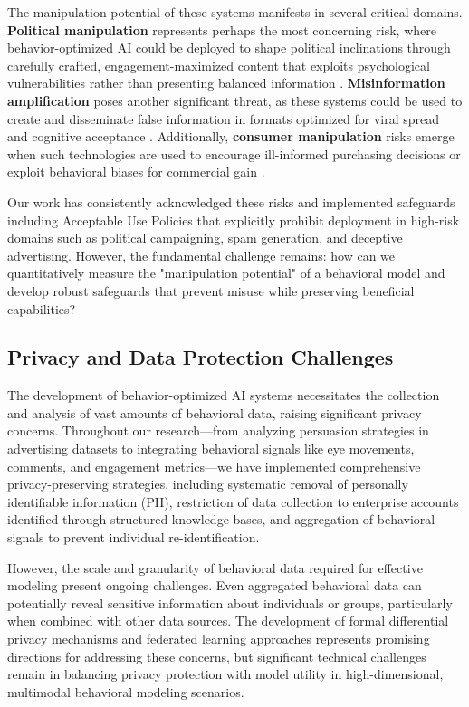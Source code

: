 The manipulation potential of these systems manifests in several critical domains. \textbf{Political manipulation} represents perhaps the most concerning risk, where behavior-optimized AI could be deployed to shape political inclinations through carefully crafted, engagement-maximized content that exploits psychological vulnerabilities rather than presenting balanced information \cite{tappin2023quantifying}. \textbf{Misinformation amplification} poses another significant threat, as these systems could be used to create and disseminate false information in formats optimized for viral spread and cognitive acceptance \cite{lukito2020coordinating}. Additionally, \textbf{consumer manipulation} risks emerge when such technologies are used to encourage ill-informed purchasing decisions or exploit behavioral biases for commercial gain \cite{boerman2017online}.

Our work has consistently acknowledged these risks and implemented safeguards including Acceptable Use Policies that explicitly prohibit deployment in high-risk domains such as political campaigning, spam generation, and deceptive advertising. However, the fundamental challenge remains: how can we quantitatively measure the "manipulation potential" of a behavioral model and develop robust safeguards that prevent misuse while preserving beneficial capabilities?

\subsection{Privacy and Data Protection Challenges}

The development of behavior-optimized AI systems necessitates the collection and analysis of vast amounts of behavioral data, raising significant privacy concerns. Throughout our research—from analyzing persuasion strategies in advertising datasets to integrating behavioral signals like eye movements, comments, and engagement metrics—we have implemented comprehensive privacy-preserving strategies, including systematic removal of personally identifiable information (PII), restriction of data collection to enterprise accounts identified through structured knowledge bases, and aggregation of behavioral signals to prevent individual re-identification.

However, the scale and granularity of behavioral data required for effective modeling present ongoing challenges. Even aggregated behavioral data can potentially reveal sensitive information about individuals or groups, particularly when combined with other data sources. The development of formal differential privacy mechanisms \cite{dwork2014algorithmic} and federated learning approaches \cite{mcmahan2017communication} represents promising directions for addressing these concerns, but significant technical challenges remain in balancing privacy protection with model utility in high-dimensional, multimodal behavioral modeling scenarios.


